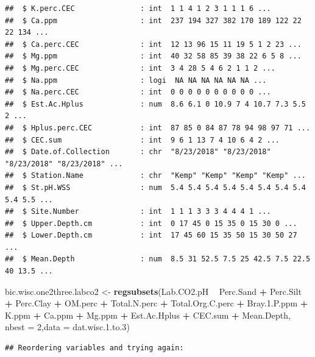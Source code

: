 \documentclass[]{article}
\newenvironment{Shaded}{\begin{snugshade}}{\end{snugshade}}
\newcommand{\DataTypeTok}[1]{\textcolor[rgb]{0.13,0.29,0.53}{#1}}
\newcommand{\DecValTok}[1]{\textcolor[rgb]{0.00,0.00,0.81}{#1}}
\newcommand{\FloatTok}[1]{\textcolor[rgb]{0.00,0.00,0.81}{#1}}
\newcommand{\KeywordTok}[1]{\textcolor[rgb]{0.13,0.29,0.53}{\textbf{#1}}}
\newcommand{\NormalTok}[1]{#1}
\newcommand{\OperatorTok}[1]{\textcolor[rgb]{0.81,0.36,0.00}{\textbf{#1}}}
\newcommand{\StringTok}[1]{\textcolor[rgb]{0.31,0.60,0.02}{#1}}
\begin{document}
\begin{verbatim}
##  $ K.perc.CEC               : int  1 1 4 1 2 3 1 1 1 6 ...
##  $ Ca.ppm                   : int  237 194 327 382 170 189 122 22 22 134 ...
##  $ Ca.perc.CEC              : int  12 13 96 15 11 19 5 1 2 23 ...
##  $ Mg.ppm                   : int  40 32 58 85 39 38 22 6 5 8 ...
##  $ Mg.perc.CEC              : int  3 4 28 5 4 6 2 1 1 2 ...
##  $ Na.ppm                   : logi  NA NA NA NA NA NA ...
##  $ Na.perc.CEC              : int  0 0 0 0 0 0 0 0 0 0 ...
##  $ Est.Ac.Hplus             : num  8.6 6.1 0 10.9 7 4 10.7 7.3 5.5 2 ...
##  $ Hplus.perc.CEC           : int  87 85 0 84 87 78 94 98 97 71 ...
##  $ CEC.sum                  : int  9 6 1 13 7 4 10 6 4 2 ...
##  $ Date.of.Collection       : chr  "8/23/2018" "8/23/2018" "8/23/2018" "8/23/2018" ...
##  $ Station.Name             : chr  "Kemp" "Kemp" "Kemp" "Kemp" ...
##  $ St.pH.WSS                : num  5.4 5.4 5.4 5.4 5.4 5.4 5.4 5.4 5.4 5.5 ...
##  $ Site.Number              : int  1 1 1 3 3 3 4 4 4 1 ...
##  $ Upper.Depth.cm           : int  0 17 45 0 15 35 0 15 30 0 ...
##  $ Lower.Depth.cm           : int  17 45 60 15 35 50 15 30 50 27 ...
##  $ Mean.Depth               : num  8.5 31 52.5 7.5 25 42.5 7.5 22.5 40 13.5 ...
\end{verbatim}

\begin{Shaded}
\begin{Highlighting}[]
\NormalTok{bic.wisc.one2three.labco2 <-}\StringTok{ }\KeywordTok{regsubsets}\NormalTok{(Lab.CO2.pH }\OperatorTok{~}\StringTok{ }\NormalTok{Perc.Sand }\OperatorTok{+}\StringTok{ }\NormalTok{Perc.Silt }\OperatorTok{+}\StringTok{ }\NormalTok{Perc.Clay }\OperatorTok{+}\StringTok{ }\NormalTok{OM.perc }\OperatorTok{+}\StringTok{ }\NormalTok{Total.N.perc }\OperatorTok{+}\StringTok{ }\NormalTok{Total.Org.C.perc }\OperatorTok{+}\StringTok{ }\NormalTok{Bray.}\FloatTok{1.}\NormalTok{P.ppm }\OperatorTok{+}\StringTok{ }\NormalTok{K.ppm }\OperatorTok{+}\StringTok{ }\NormalTok{Ca.ppm }\OperatorTok{+}\StringTok{ }\NormalTok{Mg.ppm }\OperatorTok{+}\StringTok{ }\NormalTok{Est.Ac.Hplus }\OperatorTok{+}\StringTok{ }\NormalTok{CEC.sum }\OperatorTok{+}\StringTok{ }\NormalTok{Mean.Depth, }\DataTypeTok{nbest =} \DecValTok{2}\NormalTok{,}\DataTypeTok{data =}\NormalTok{ dat.wisc.}\FloatTok{1.}\NormalTok{to}\FloatTok{.3}\NormalTok{)}
\end{Highlighting}
\end{Shaded}

\begin{verbatim}
## Reordering variables and trying again:
\end{verbatim}
\end{document}
